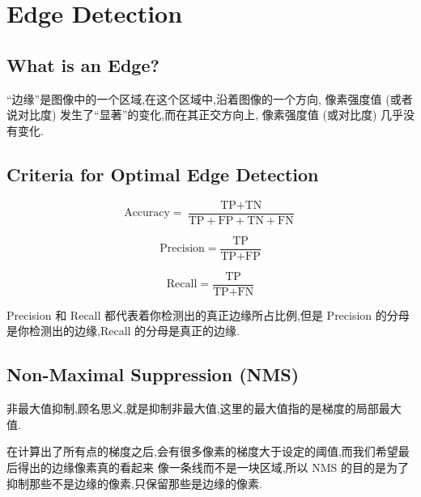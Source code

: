 \chapter{Edge Detection}

\section{What is an Edge?}

“边缘”是图像中的一个区域,在这个区域中,沿着图像的一个方向,
像素强度值 (或者说对比度) 发生了“显著”的变化,而在其正交方向上,
像素强度值 (或对比度) 几乎没有变化.

\section{Criteria for Optimal Edge Detection}

\begin{equation}
\text{Accuracy}=\frac{\text{TP}+\text{TN}}{\text{TP}+\text{FP}+\text{TN}+\text{FN}} 
\end{equation}

\begin{equation}
\text{Precision}=\frac{\text{TP}}{\text{TP}+\text{FP}} 
\end{equation}

\begin{equation}
\text{Recall}=\frac{\text{TP}}{\text{TP}+\text{FN}}
\end{equation}

Precision 和 Recall 都代表着你检测出的真正边缘所占比例,但是 Precision 的分母
是你检测出的边缘,Recall 的分母是真正的边缘.

\section{Non-Maximal Suppression (NMS)}

非最大值抑制,顾名思义,就是抑制非最大值,这里的最大值指的是梯度的局部最大值.

在计算出了所有点的梯度之后,会有很多像素的梯度大于设定的阈值,而我们希望最后得出的边缘像素真的看起来
像一条线而不是一块区域,所以 NMS 的目的是为了抑制那些不是边缘的像素,只保留那些是边缘的像素.

